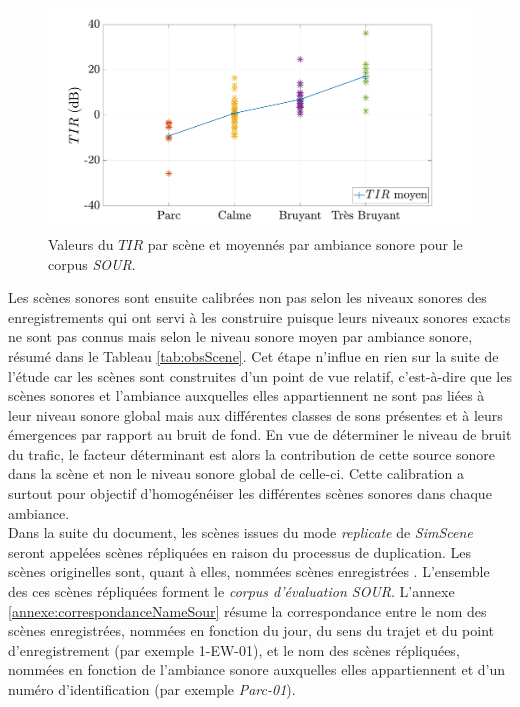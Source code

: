 \begin{figure}[h]
\centering
\includegraphics[width=.8\linewidth]{./figures/grafic/TIR_grafic.pdf}
\caption{Valeurs du $TIR$ par scène et moyennés par ambiance sonore pour le corpus \textit{SOUR}.}
\label{fig:tir_grafic}
\end{figure}

Les scènes sonores sont ensuite calibrées non pas selon les niveaux sonores des enregistrements qui ont servi à les construire puisque leurs niveaux sonores exacts ne sont pas connus mais selon le niveau sonore moyen par ambiance sonore, résumé dans le Tableau \ref{tab:obsScene}. 
Cet étape n'influe en rien sur la suite de l'étude car les scènes sont construites d'un point de vue relatif, c'est-à-dire que les scènes sonores et l'ambiance auxquelles elles appartiennent ne sont pas liées à leur niveau sonore global mais aux différentes classes de sons présentes et à leurs émergences par rapport au bruit de fond. En vue de déterminer le niveau de bruit du trafic, le facteur déterminant est alors la contribution de cette source sonore dans la scène et non le niveau sonore global de celle-ci. Cette calibration a surtout pour objectif d'homogénéiser les différentes scènes sonores dans chaque ambiance.\\

Dans la suite du document, les scènes issues du mode \textit{replicate} de \textit{SimScene} seront appelées \og scènes répliquées \fg{} en raison du processus de duplication. Les scènes originelles sont, quant à elles, nommées \og scènes enregistrées \fg{}. L'ensemble des ces scènes répliquées forment le \textit{corpus d'évaluation SOUR}. L'annexe \ref{annexe:correspondanceNameSour} résume la correspondance entre le nom des scènes enregistrées, nommées en fonction du jour, du sens du trajet et du point d'enregistrement (par exemple 1-EW-01), et le nom des scènes répliquées, nommées en fonction de l'ambiance sonore auxquelles elles appartiennent et d'un numéro d'identification (par exemple \textit{Parc-01}). \\


